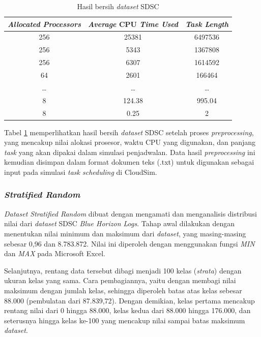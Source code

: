 \begin{table} [H]
    \centering
    \caption{Hasil bersih \textit{dataset} SDSC}
    \label{tabel:Hasil Bersih Dataset SDSC}
    \begin{tabular}{c c c}
    \toprule
    \textit{Allocated Processors} & \textit{Average} CPU \textit{Time Used} & \textit{Task Length} \\
    \midrule
    256 & 25381   & 6497536 \\
    256 & 5343    & 1367808 \\
    256 & 6307    & 1614592 \\
    64  & 2601    & 166464 \\
    \multicolumn{1}{c}{\dots} & \multicolumn{1}{c}{\dots} & \multicolumn{1}{c}{\dots} \\
    8   & 124.38  & 995.04 \\
    8   & 0.25    & 2 \\
    \bottomrule
    \end{tabular}
\end{table}

Tabel \ref{tabel:Hasil Bersih Dataset SDSC} memperlihatkan hasil bersih \textit{dataset} SDSC setelah proses \textit{preprocessing}, yang mencakup nilai alokasi prosesor, waktu CPU yang digunakan, dan panjang \textit{task} yang akan dipakai dalam simulasi penjadwalan. Data hasil \textit{preprocessing} ini kemudian disimpan dalam format dokumen teks (.txt) untuk digunakan sebagai input pada simulasi \textit{task scheduling} di CloudSim.

\subsubsection{\textit{Stratified Random}}
\textit{Dataset Stratified Random} dibuat dengan mengamati dan menganalisis distribusi nilai dari \textit{dataset} SDSC \textit{Blue Horizon Logs}. Tahap awal dilakukan dengan menentukan nilai minimum dan maksimum dari \textit{dataset}, yang masing-masing sebesar 0,96 dan 8.783.872. Nilai ini diperoleh dengan menggunakan fungsi \textit{MIN} dan \textit{MAX} pada Microsoft Excel.

Selanjutnya, rentang data tersebut dibagi menjadi 100 kelas (\textit{strata}) dengan ukuran kelas yang sama. Cara pembagiannya, yaitu dengan membagi nilai maksimum dengan jumlah kelas, sehingga diperoleh batas atas kelas sebesar 88.000 (pembulatan dari 87.839,72). Dengan demikian, kelas pertama mencakup rentang nilai dari 0 hingga 88.000, kelas kedua dari 88.000 hingga 176.000, dan seterusnya hingga kelas ke-100 yang mencakup nilai sampai batas maksimum \textit{dataset}.

